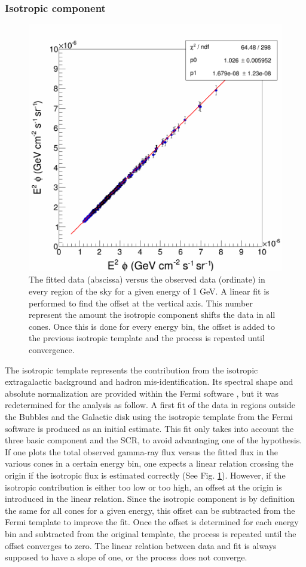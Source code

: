 \subsubsection{Isotropic component}

\begin{figure}
 \centering
 \includegraphics[width=.5\linewidth]{pic/method/iso_calibration.png}
 \caption{The fitted data (abscissa) versus the observed data (ordinate) in every region of the sky for a given energy of 1 GeV. A linear fit is performed to find the offset at the vertical axis. This number represent the amount the isotropic component shifts the data in all cones. Once this is done for every energy bin, the offset is added to the previous isotropic template and the process is repeated until convergence.}
 \label{fig:iso_calibration}
\end{figure}


The isotropic template represents the contribution from the isotropic extragalactic background and hadron mis-identification. Its spectral shape and absolute normalization are provided within the Fermi software , but it was redetermined for the analysis as follow.
A first fit of the data in regions outside the Bubbles and the Galactic disk using the isotropic template from the Fermi software is produced as an initial estimate. This fit only takes into account the three basic component and the SCR, to avoid advantaging one of the hypothesis. If one plots the total observed gamma-ray flux versus the fitted flux in the various cones in a certain energy bin, one expects a linear relation crossing the origin if the isotropic flux is estimated correctly (See Fig. \ref{fig:iso_calibration}). However, if the isotropic contribution is either too low or too high, an offset at the origin is introduced in the linear relation. Since the isotropic component is by definition the same for all cones for a given energy, this offset can be subtracted from the Fermi template to improve the fit. 
Once the offset is determined for each energy bin and subtracted from the original template, the process is repeated until the offset converges to zero.
The linear relation between data and fit is always supposed to have a slope of one, or the process does not converge.

